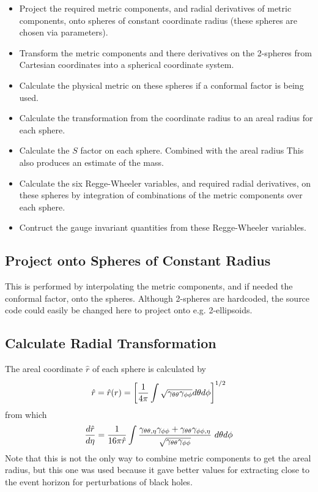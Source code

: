 \documentclass{article}
\begin{document}
\begin{itemize}

  \item Project the required metric components, and radial derivatives
  of metric components, onto spheres of constant coordinate radius
  (these spheres are chosen via parameters).

  \item Transform the metric components and there derivatives on the
  2-spheres from Cartesian coordinates into a spherical coordinate
  system.

  \item Calculate the physical metric on these spheres if a conformal
  factor is being used.

  \item Calculate the transformation from the coordinate radius to an
  areal radius for each sphere.

  \item Calculate the $S$ factor on each sphere. Combined with the
  areal radius This also produces an estimate of the mass.

  \item Calculate the six Regge-Wheeler variables, and required radial
  derivatives, on these spheres by integration of combinations of the
  metric components over each sphere.

  \item Contruct the gauge invariant quantities from these
  Regge-Wheeler variables.

\end{itemize}

\subsection{Project onto Spheres of Constant Radius}

This is performed by interpolating the metric components, and if
needed the conformal factor, onto the spheres. Although 2-spheres are
hardcoded, the source code could easily be changed here to project
onto e.g. 2-ellipsoids.

\subsection{Calculate Radial Transformation}

The areal coordinate $\hat{r}$ of each sphere is calculated by
%
\begin{equation}
  \hat{r}    =  \hat{r}(r) = \left[
            \frac{1}{4\pi}
            \int\sqrt{\gamma_{\theta\theta}
            \gamma_{\phi\phi}}d\theta d\phi \right]^{1/2}
\end{equation}
%
from which
%
\begin{equation}
\frac{d\hat{r}}{d\eta} = \frac{1}{16\pi \hat{r}}
  \int\frac{\gamma_{\theta\theta,\eta}\gamma_{\phi\phi}+\gamma_{\theta\theta}\gamma_{\phi\phi,\eta}}
  {\sqrt{\gamma_{\theta\theta}\gamma_{\phi\phi}}} \ d\theta d\phi
\end{equation}
%
Note that this is not the only way to combine metric components to get
the areal radius, but this one was used because it gave better values
for extracting close to the event horizon for perturbations of black
holes.
\end{document}
